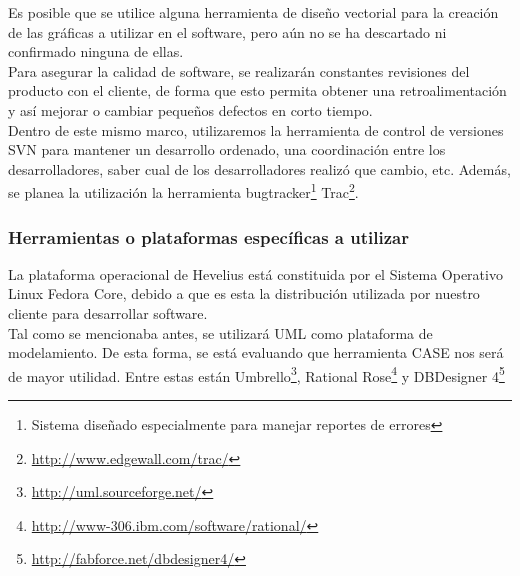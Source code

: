 \documentclass[letterpaper,spanish,10pt]{article}
\begin{document}
Es posible que se utilice alguna herramienta de dise\~no vectorial para la creaci\'on de las gr\'aficas a utilizar en el software, pero a\'un no se ha descartado ni confirmado ninguna de ellas.\\

Para asegurar la calidad de software, se realizar\'an constantes revisiones del producto con el cliente, de forma que esto permita obtener una retroalimentaci\'on y as\'i mejorar o cambiar peque\~nos defectos en corto tiempo.\\

Dentro de este mismo marco, utilizaremos la herramienta de control de versiones SVN para mantener un desarrollo ordenado, una coordinaci\'on entre los desarrolladores, saber cual de los desarrolladores realiz\'o que cambio, etc. 
Adem\'as, se planea la utilizaci\'on la herramienta bugtracker\footnote{Sistema dise\~nado especialmente para manejar reportes de errores} Trac\footnote{\url{http://www.edgewall.com/trac/}}.



\subsubsection{Herramientas o plataformas espec\'ificas a utilizar}

La plataforma operacional de Hevelius est\'a constituida por el Sistema Operativo Linux Fedora Core, debido a que es esta la distribuci\'on utilizada por nuestro cliente para desarrollar software.\\



Tal como se mencionaba antes, se utilizar\'a UML como plataforma de modelamiento. De esta forma, se est\'a evaluando que herramienta CASE nos ser\'a de mayor utilidad. Entre estas est\'an Umbrello\footnote{\url{http://uml.sourceforge.net/}}, Rational Rose\footnote{\url{http://www-306.ibm.com/software/rational/}} y DBDesigner 4\footnote{\url{http://fabforce.net/dbdesigner4/}}

\end{document}
